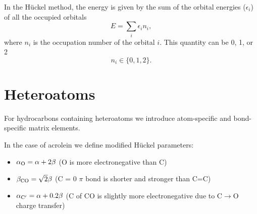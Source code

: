 \documentclass[../Main/chem532-notes.tex]{subfiles}
\begin{document}
%

In the H\"{u}ckel method, the energy is given by the sum of the orbital energies ($\epsilon_i$) of all the occupied orbitals
\begin{equation}
E = \sum_i \epsilon_i n_i,
\end{equation}
where $n_i$ is the occupation number of the orbital $i$. This quantity can be 0, 1, or 2
\begin{equation}
n_i \in \{0, 1, 2 \}.
\end{equation}




\section{Heteroatoms}

For hydrocarbons containing heteroatoms we introduce atom-specific and bond-specific matrix elements.
\begin{example}[Acrolein]

In the case of acrolein we define modified H\"{u}ckel parameters:
\begin{itemize}
\item $\alpha_{\rm O} = \alpha + 2 \beta$	(O is more electronegative than C)
\item $\beta_{\rm CO} = \sqrt{2} \beta$	(C = 0 $\pi$ bond is shorter and stronger than C=C)
\item $\alpha_{\rm C'} = \alpha + 0.2 \beta$	(C of CO is slightly more electronegative due to C$\rightarrow$O charge transfer)
\end{itemize}
\end{example}
\end{document}
